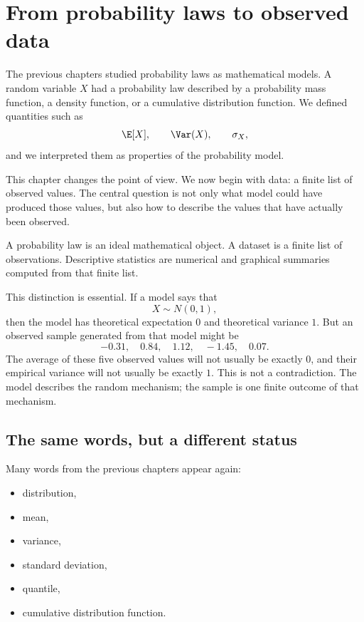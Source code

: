 \section{From probability laws to observed data}

The previous chapters studied probability laws as mathematical models. A random
variable \(X\) had a probability law described by a probability mass function, a
density function, or a cumulative distribution function. We defined quantities
such as
\[
\E[X],\qquad \Var(X),\qquad \sigma_X,
\]
and we interpreted them as properties of the probability model.

This chapter changes the point of view. We now begin with data: a finite list of
observed values. The central question is not only what model could have produced
those values, but also how to describe the values that have actually been
observed.

\begin{summarybox}
A probability law is an ideal mathematical object. A dataset is a finite list of
observations. Descriptive statistics are numerical and graphical summaries
computed from that finite list.
\end{summarybox}

This distinction is essential. If a model says that
\[
X\sim N(0,1),
\]
then the model has theoretical expectation \(0\) and theoretical variance \(1\).
But an observed sample generated from that model might be
\[
-0.31,\quad 0.84,\quad 1.12,\quad -1.45,\quad 0.07.
\]
The average of these five observed values will not usually be exactly \(0\), and
their empirical variance will not usually be exactly \(1\). This is not a
contradiction. The model describes the random mechanism; the sample is one finite
outcome of that mechanism.

\subsection*{The same words, but a different status}

Many words from the previous chapters appear again:
\begin{itemize}
    \item distribution,
    \item mean,
    \item variance,
    \item standard deviation,
    \item quantile,
    \item cumulative distribution function.
\end{itemize}

